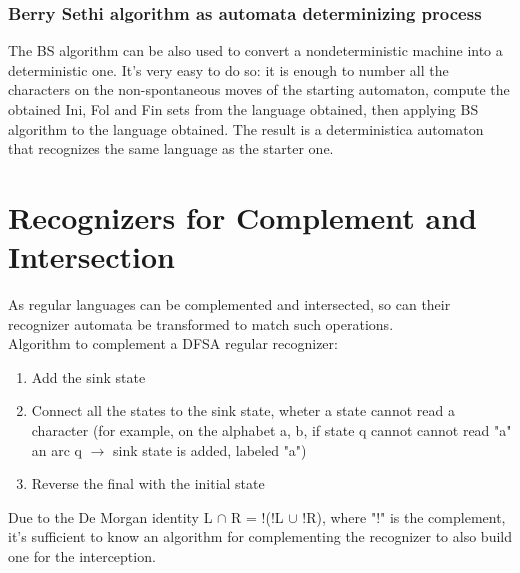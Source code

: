 			\subsubsection{Berry Sethi algorithm as automata determinizing process}
				The BS algorithm can be also used to convert a nondeterministic machine into a deterministic one. It's very easy to do so: it is enough to number all the characters on the non-spontaneous moves of the starting automaton, compute the obtained Ini, Fol and Fin sets from the language obtained, then applying BS algorithm to the language obtained. The result is a deterministica automaton that recognizes the same language as the starter one. 
			
	\section{Recognizers for Complement and Intersection}
		As regular languages can be complemented and intersected, so can their recognizer automata be transformed to match such operations.\\
		Algorithm to complement a DFSA regular recognizer:
		\begin{enumerate}
			\item Add the sink state
			\item Connect all the states to the sink state, wheter a state cannot read a character (for example, on the alphabet {a, b}, if state q cannot cannot read "a" an arc q $\rightarrow$ sink state is added, labeled "a")
			\item Reverse the final with the initial state
		\end{enumerate}
		
		Due to the De Morgan identity L $\cap$ R = !(!L $\cup$ !R), where "!" is the complement, it's sufficient to know an algorithm for complementing the recognizer to also build one for the interception. 